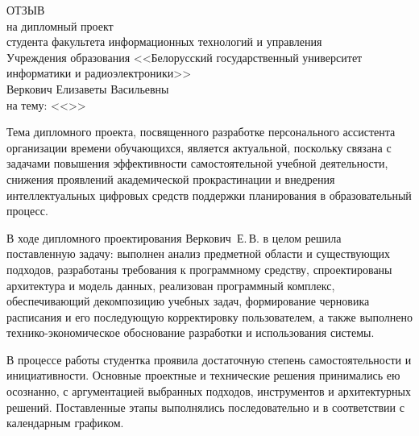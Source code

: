 

\thispagestyle{empty}

\begin{singlespace}

{\small
  \begin{center}
    \begin{minipage}{0.8\textwidth}
      \begin{center}
        {\normalsize ОТЗЫВ}\\[1em]
        на дипломный проект\\студента факультета информационных технологий 
        и управления\\Учреждения образования <<Белорусский государственный университет информатики и радиоэлектроники>>\\
        Веркович Елизаветы Васильевны\\
        на тему: <<\topicName>>
      \end{center}
    \end{minipage}
  \end{center}

Тема дипломного проекта, посвященного разработке персонального ассистента организации времени обучающихся, является актуальной, поскольку связана с задачами повышения эффективности самостоятельной учебной деятельности, снижения проявлений академической прокрастинации и внедрения интеллектуальных цифровых средств поддержки планирования в образовательный процесс.

В ходе дипломного проектирования Веркович~Е.\,В. в целом решила поставленную задачу: выполнен анализ предметной области и существующих подходов, разработаны требования к программному средству, спроектированы архитектура и модель данных, реализован программный комплекс, обеспечивающий декомпозицию учебных задач, формирование черновика расписания и его последующую корректировку пользователем, а также выполнено технико-экономическое обоснование разработки и использования системы.

В процессе работы студентка проявила достаточную степень самостоятельности и инициативности. Основные проектные и технические решения принимались ею осознанно, с аргументацией выбранных подходов, инструментов и архитектурных решений. Поставленные этапы выполнялись последовательно и в соответствии с календарным графиком.

}
\end{singlespace}
